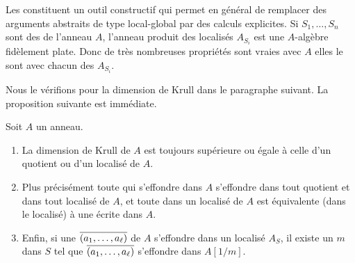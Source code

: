 Les \moco constituent un outil constructif qui permet en général de 
remplacer des arguments abstraits de type local-global par des calculs 
explicites.
Si  $S_1,\ldots ,S_n$ sont des \moco de l'anneau $A$, l'anneau produit des 
localisés $A_{S_i}$ est une $A$-algèbre fidèlement plate.
Donc de très nombreuses propriétés sont vraies avec $A$ \ssi elles 
le sont avec chacun des $A_{S_i}$.

Nous le vérifions pour la dimension de Krull dans le paragraphe suivant.
La proposition suivante est immédiate.
\begin{proposition} 
\label{propKrLoc} 
Soit $A$ un anneau. 
%
\begin{enumerate}
%
\item La dimension de Krull de $A$ est toujours supérieure ou 
égale à celle d'un quotient ou d'un localisé de $A$. 
%
\item Plus précisément toute \proel qui s'effondre dans $A$ s'effondre 
dans tout quotient et dans tout localisé de $A$, et toute \proel  
dans un localisé de $A$ est équivalente 
(dans le localisé) à une \proel 
écrite dans $A$.
%
\item Enfin, si une \proel $\overline{(a_1,\ldots,a_\ell)}$ de $A$ s'effondre dans un 
localisé $A_S$, il existe un $m$ dans $S$ tel que  
$\overline{(a_1,\ldots,a_\ell)}$ 
s'effondre dans $A[1/m]$.
%
\end{enumerate}
\end{proposition}

